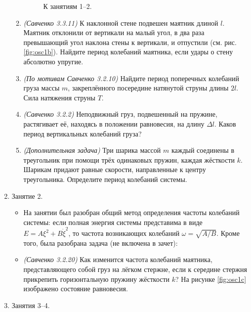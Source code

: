 \documentclass[12pt]{article}
\newlength{\h}
\newlength{\x}
\begin{document}
\begin{enumerate}
\begin{enumerate}
\begin{figure}[ht]
      \caption{К занятиям 1--2.}
    \end{figure}
  \item \textit{(Савченко 3.3.11)} К наклонной стене подвешен маятник
    длиной $l$. Маятник отклонили от вертикали на малый угол, в два
    раза превышающий угол наклона стены к вертикали, и отпустили
    (см. рис. \ref{fig:osc1b}). Найдите период колебаний маятника,
    если удары о стену абсолютно упругие.
  \item \textit{(По мотивам Савченко 3.2.10)} Найдите период
    поперечных колебаний груза массы $m$, закреплённого посередине
    натянутой струны длины $2l$. Сила натяжения струны $T$.
  \item \textit{(Савченко 3.2.2)} Неподвижный груз, подвешенный на
    пружине, растягивает её, находясь в положении равновесия, на длину
    $\Delta l$. Каков период вертикальных колебаний груза?
  \item \textit{(Дополнительная задача)} Три шарика массой $m$ каждый
    соединены в треугольник при помощи трёх одинаковых пружин, каждая
    жёсткости $k$. Шарикам придают равные скорости, направленные к
    центру треугольника. Определите период колебаний системы. 
  \end{enumerate}
\item Занятие 2.
  \begin{itemize}
    \item На занятии был разобран общий метод определения частоты 
      колебаний системы: если полная энергия системы представима в виде 
      $E = A\xi^2 + B\dot{\xi}^2$, то частота возникающих колебаний 
      $\omega = \sqrt{A/B}$. Кроме того, была разобрана задача
      (не включена в зачет):
    \item \textit{(Савченко 3.2.20)} Как изменится частота колебаний
      маятника, представляющего собой груз на лёгком стержне, если к
      середине стержня прикрепить горизонтальную пружину жёсткости $k$?
      На рисунке \ref{fig:osc1c} изображено состояние равновесия.
  \end{itemize}
\item Занятия 3--4.
  \begin{figure}[ht]
    \centering
\end{figure}
\end{enumerate}
\end{document}
